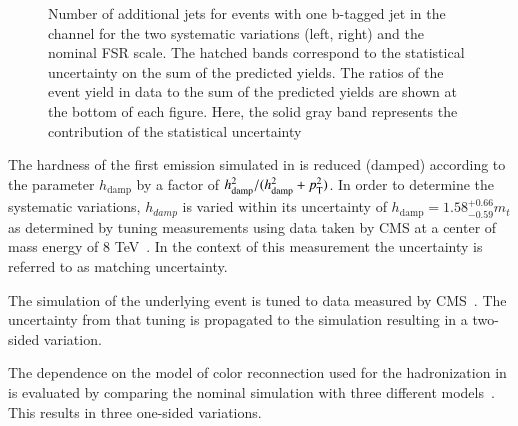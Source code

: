 \begin{figure}[htbp!]
\begin{center}
\caption{Number of additional jets for events with one b-tagged jet in the \emu channel for the two systematic variations (left, right) and the nominal FSR scale.
The hatched bands correspond to the statistical uncertainty on the sum of the predicted yields. 
        The ratios of the event yield in data to the sum of the predicted yields are
        shown at the bottom of each figure. Here, the solid gray band
        represents the contribution of the statistical uncertainty
  \label{fig:control_var_TT_FSRSCALE}}
  \end{center}
\end{figure}


The hardness of the first emission simulated in \POWHEG is reduced (damped) according to the parameter $h_{\mathrm{damp}}$ by a factor of $h_{\mathrm{damp}}^2 / (h_{\mathrm{damp}}^2 + p_{\mathrm{T}}^2)$.
In order to determine the systematic variations, $h_{damp}$ is varied within its uncertainty of $h_{\mathrm{damp}} = 1.58^{+0.66}_{-0.59} m_t$
as determined by tuning measurements using data taken by CMS at a center of mass energy of 8 TeV~\cite{CMS-PAS-TOP-16-021}.
In the context of this measurement the uncertainty is referred to as matching uncertainty.

The simulation of the underlying event is tuned to data measured by CMS~\cite{CMS-PAS-TOP-16-021}. The uncertainty from that tuning is propagated to the simulation resulting in a two-sided variation.

The dependence on the model of color reconnection used for the hadronization in \PYTHIA is evaluated by comparing the nominal simulation with three different models~\cite{Argyropoulos:2014zoa,Christiansen:2015yqa}. This results in three one-sided variations.

